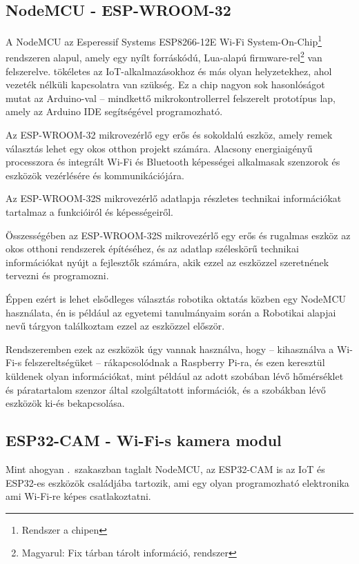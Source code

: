 \documentclass[
]{thesis-ekf}
\theoremstyle{definition}
\theoremstyle{remark}
\begin{document}
	\subsection{NodeMCU - ESP-WROOM-32}\label{nodemcu-sec}
	
	A NodeMCU az Esperessif Systems ESP8266-12E Wi-Fi System-On-Chip\footnote{Rendszer a chipen} rendszeren alapul, amely egy nyílt forráskódú, Lua-alapú firmware-rel\footnote{Magyarul: Fix tárban tárolt információ, rendszer} van felszerelve. tökéletes az IoT-alkalmazásokhoz és más olyan helyzetekhez, ahol vezeték nélküli kapcsolatra van szükség. Ez a chip nagyon sok hasonlóságot mutat az Arduino-val – mindkettő mikrokontrollerrel felszerelt prototípus lap, amely az Arduino IDE segítségével programozható.\cite{esp-8266}
	
	Az ESP-WROOM-32 mikrovezérlő egy erős és sokoldalú eszköz, amely remek választás lehet egy okos otthon projekt számára. Alacsony energiaigényű processzora és integrált Wi-Fi és Bluetooth képességei alkalmasak szenzorok és eszközök vezérlésére és kommunikációjára.
	
	Az ESP-WROOM-32S mikrovezérlő adatlapja részletes technikai információkat tartalmaz a funkcióiról és képességeiről.\cite{esp-32-datasheet}
	
	Összességében az ESP-WROOM-32S mikrovezérlő egy erős és rugalmas eszköz az okos otthoni rendszerek építéséhez, és az adatlap széleskörű technikai információkat nyújt a fejlesztők számára, akik ezzel az eszközzel szeretnének tervezni és programozni.
	
	Éppen ezért is lehet elsődleges választás robotika oktatás közben egy NodeMCU használata, én is például az egyetemi tanulmányaim során a Robotikai alapjai nevű tárgyon találkoztam ezzel az eszközzel először.
	
	Rendszeremben ezek az eszközök úgy vannak használva, hogy -- kihasználva a Wi-Fi-s felszereltségüket -- rákapcsolódnak a Raspberry Pi-ra, és ezen keresztül küldenek olyan információkat, mint például az adott szobában lévő hőmérséklet és páratartalom szenzor által szolgáltatott információk, és a szobákban lévő eszközök ki-és bekapcsolása.
	
	\subsection{ESP32-CAM - Wi-Fi-s kamera modul}
	
	Mint ahogyan .~szakaszban taglalt NodeMCU, az ESP32-CAM is az IoT és ESP32-es eszközök családjába tartozik, ami egy olyan programozható elektronika ami Wi-Fi-re képes csatlakoztatni.
	
\end{document}
